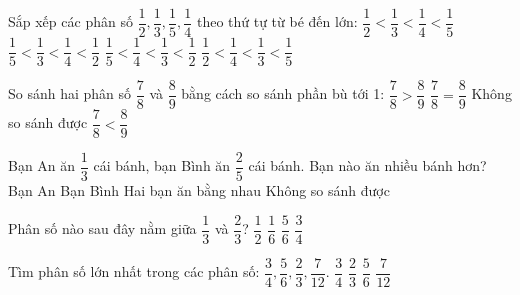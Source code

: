 \begin{ex} %
Sắp xếp các phân số $\dfrac{1}{2}, \dfrac{1}{3}, \dfrac{1}{5}, \dfrac{1}{4}$ theo thứ tự từ bé đến lớn:
\choice
{$\dfrac{1}{2} < \dfrac{1}{3} < \dfrac{1}{4} < \dfrac{1}{5}$}
{$\dfrac{1}{5} < \dfrac{1}{3} < \dfrac{1}{4} < \dfrac{1}{2}$}
{\True $\dfrac{1}{5} < \dfrac{1}{4} < \dfrac{1}{3} < \dfrac{1}{2}$}
{$\dfrac{1}{2} < \dfrac{1}{4} < \dfrac{1}{3} < \dfrac{1}{5}$}
\end{ex}

\begin{ex} %
So sánh hai phân số $\dfrac{7}{8}$ và $\dfrac{8}{9}$ bằng cách so sánh phần bù tới 1:
\choice
{$\dfrac{7}{8} > \dfrac{8}{9}$}
{$\dfrac{7}{8} = \dfrac{8}{9}$}
{Không so sánh được}
{\True $\dfrac{7}{8} < \dfrac{8}{9}$}
\end{ex}

\begin{ex} %
Bạn An ăn $\dfrac{1}{3}$ cái bánh, bạn Bình ăn $\dfrac{2}{5}$ cái bánh. Bạn nào ăn nhiều bánh hơn?
\choice
{Bạn An}
{\True Bạn Bình}
{Hai bạn ăn bằng nhau}
{Không so sánh được}
\end{ex}

\begin{ex} %
Phân số nào sau đây nằm giữa $\dfrac{1}{3}$ và $\dfrac{2}{3}$?
\choice
{\True $\dfrac{1}{2}$}
{$\dfrac{1}{6}$}
{$\dfrac{5}{6}$}
{$\dfrac{3}{4}$}
\end{ex}

\begin{ex} %
Tìm phân số lớn nhất trong các phân số: $\dfrac{3}{4}, \dfrac{5}{6}, \dfrac{2}{3}, \dfrac{7}{12}$.
\choice
{$\dfrac{3}{4}$}
{$\dfrac{2}{3}$}
{\True $\dfrac{5}{6}$}
{$\dfrac{7}{12}$}
\end{ex}


